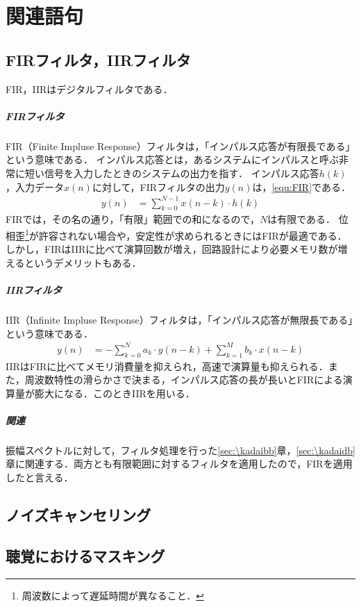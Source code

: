 \chapter{関連語句}
\section{FIRフィルタ，IIRフィルタ}
FIR，IIRはデジタルフィルタである．
\paragraph{FIRフィルタ}
FIR（Finite Impluse Response）フィルタは，「インパルス応答が有限長である」という意味である\cite[p.92]{音声音響インタフェース実践}．
インパルス応答とは，あるシステムにインパルスと呼ぶ非常に短い信号を入力したときのシステムの出力を指す．
インパルス応答\(h(k)\)，入力データ\(x(n)\)に対して，FIRフィルタの出力\(y(n)\)は，\eqref{equ:FIR}である．
\begin{align}
    y(n) & =\sum_{k=0}^{N-1}x(n-k)\cdot h(k)\label{equ:FIR}
\end{align}
FIRでは，その名の通り，「有限」範囲での和になるので，\(N\)は有限である．
位相歪\footnote{周波数によって遅延時間が異なること．}が許容されない場合や，安定性が求められるときにはFIRが最適である．
しかし，FIRはIIRに比べて演算回数が増え，回路設計により必要メモリ数が増えるというデメリットもある．
\paragraph{IIRフィルタ}
IIR（Infinite Impluse Response）フィルタは，「インパルス応答が無限長である」という意味である\cite[p.92]{音声音響インタフェース実践}．
\begin{align}
    y(n) & =-\sum_{k=0}^{N}a_k\cdot y(n-k)+\sum_{k=1}^{M}b_k\cdot x(n-k)\label{equ:IIR}
\end{align}
IIRはFIRに比べてメモリ消費量を抑えられ，高速で演算量も抑えられる．また，周波数特性の滑らかさで決まる，インパルス応答の長が長いとFIRによる演算量が膨大になる．このときIIRを用いる．
\paragraph{関連}
振幅スペクトルに対して，フィルタ処理を行った\ref{sec:\kadaibb}章，\ref{sec:\kadaidb}章に関連する．両方とも有限範囲に対するフィルタを適用したので，FIRを適用したと言える．

\section{ノイズキャンセリング}
\section{聴覚におけるマスキング}